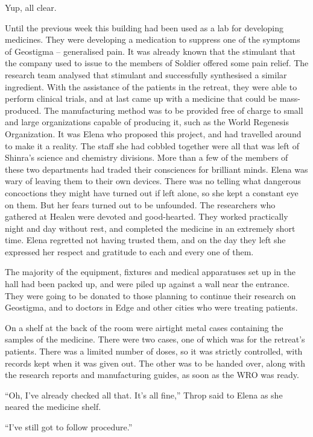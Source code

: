 \documentclass[oneside]{book}
\begin{document}
Yup, all clear.

Until the previous week this building had been used as a lab for developing medicines. They were developing a medication to suppress one of the symptoms of Geostigma – generalised pain. It was already known that the stimulant that the company used to issue to the members of Soldier offered some pain relief. The research team analysed that stimulant and successfully synthesised a similar ingredient. With the assistance of the patients in the retreat, they were able to perform clinical trials, and at last came up with a medicine that could be mass-produced. The manufacturing method was to be provided free of charge to small and large organizations capable of producing it, such as the World Regenesis Organization. It was Elena who proposed this project, and had travelled around to make it a reality. The staff she had cobbled together were all that was left of Shinra’s science and chemistry divisions. More than a few of the members of these two departments had traded their consciences for brilliant minds. Elena was wary of leaving them to their own devices. There was no telling what dangerous concoctions they might have turned out if left alone, so she kept a constant eye on them. But her fears turned out to be unfounded. The researchers who gathered at Healen were devoted and good-hearted. They worked practically night and day without rest, and completed the medicine in an extremely short time. Elena regretted not having trusted them, and on the day they left she expressed her respect and gratitude to each and every one of them.

The majority of the equipment, fixtures and medical apparatuses set up in the hall had been packed up, and were piled up against a wall near the entrance. They were going to be donated to those planning to continue their research on Geostigma, and to doctors in Edge and other cities who were treating patients.

On a shelf at the back of the room were airtight metal cases containing the samples of the medicine. There were two cases, one of which was for the retreat’s patients. There was a limited number of doses, so it was strictly controlled, with records kept when it was given out. The other was to be handed over, along with the research reports and manufacturing guides, as soon as the WRO was ready.

“Oh, I’ve already checked all that. It’s all fine,” Throp said to Elena as she neared the medicine shelf.

“I’ve still got to follow procedure.”
\end{document}
